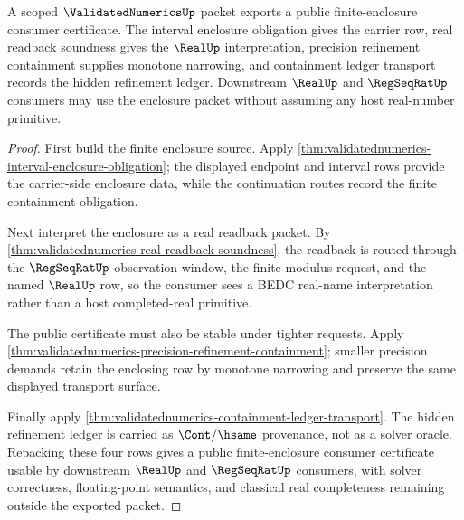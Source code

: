 \begin{theorem}
\label{thm:validatednumerics-public-finite-enclosure-consumer-certificate}
A scoped $\ValidatedNumericsUp$ packet exports a public finite-enclosure
consumer certificate. The interval enclosure obligation gives the carrier row,
real readback soundness gives the $\RealUp$ interpretation, precision refinement
containment supplies monotone narrowing, and containment ledger transport
records the hidden refinement ledger. Downstream $\RealUp$ and $\RegSeqRatUp$
consumers may use the enclosure packet without assuming any host real-number
primitive.
\end{theorem}
\begin{proof}
First build the finite enclosure source. Apply
\autoref{thm:validatednumerics-interval-enclosure-obligation}; the displayed
endpoint and interval rows provide the carrier-side enclosure data, while the
continuation routes record the finite containment obligation.

Next interpret the enclosure as a real readback packet. By
\autoref{thm:validatednumerics-real-readback-soundness}, the readback is routed
through the $\RegSeqRatUp$ observation window, the finite modulus request, and
the named $\RealUp$ row, so the consumer sees a BEDC real-name interpretation
rather than a host completed-real primitive.

The public certificate must also be stable under tighter requests. Apply
\autoref{thm:validatednumerics-precision-refinement-containment}; smaller
precision demands retain the enclosing row by monotone narrowing and preserve
the same displayed transport surface.

Finally apply
\autoref{thm:validatednumerics-containment-ledger-transport}. The hidden
refinement ledger is carried as $\Cont/\hsame$ provenance, not as a solver
oracle. Repacking these four rows gives a public finite-enclosure consumer
certificate usable by downstream $\RealUp$ and $\RegSeqRatUp$ consumers, with
solver correctness, floating-point semantics, and classical real completeness
remaining outside the exported packet.
\end{proof}

